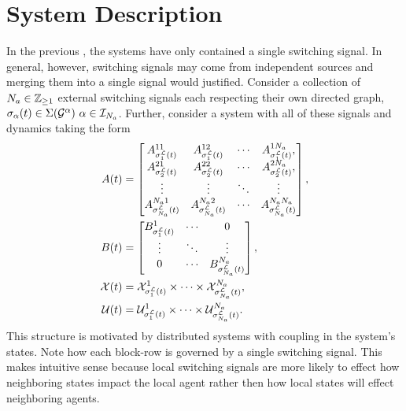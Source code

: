 
\section{System Description}
In the previous , the systems have only contained a single switching signal. In general, however, switching signals may come from independent sources and merging them into a single signal would  justified. Consider a collection of ${N_a}\in\mathbb{Z}_{\geq 1}$ external switching signals each respecting their own directed graph, $\ss_\agentidx(t)\in\Sigma(\graph^\agentidx)\ \agentidx\in\idxset{\numagents}$. Further, consider a system with all of these signals and dynamics taking the form
\begin{subequations}
\label{eq:sys}
\begin{align}
A(t)&=\begin{bmatrix}
A^{11}_{\ssl[1](t)}&A^{12}_{\ssl[1](t)}&\cdots&A^{1\numagents}_{\ssl[1](t)},\\
A^{21}_{\ssl[2](t)}&A^{22}_{\ssl[2](t)}&\cdots&A^{2\numagents}_{\ssl[2](t)},\\
\vdots&\vdots & \ddots & \vdots\\
A^{\numagents 1}_{\ssl[\numagents](t)} & A^{\numagents 2}_{\ssl[\numagents](t)} &\cdots & A^{\numagents \numagents}_{\ssl[\numagents](t)} 
\end{bmatrix},\label{eq:sys_A}\\
B(t)&=\begin{bmatrix}
B^{1}_{\ssl[1](t)} & \cdots & 0\\
\vdots             & \ddots & \vdots\\
0                  & \cdots & B^{\numagents}_{\ssl[\numagents](t)}
\end{bmatrix},\label{eq:sys_B}\\
\xcon(t)&=\xcon[\ssl[1](t)]^1\times\cdots\times\xcon[\ssl[\numagents](t)]^\numagents,\label{eq:sys_X}\\
\ucon(t)&=\ucon[\ssl[1](t)]^1\times\cdots\times\ucon[\ssl[\numagents](t)]^\numagents\label{eq:sys_Y}.
\end{align}
\end{subequations}
This structure is motivated by distributed systems with coupling in the system's states. Note how each block-row is governed by a single switching signal. This makes intuitive sense because local switching signals are more likely to effect how neighboring states impact the local agent rather then how local states will effect neighboring agents.

